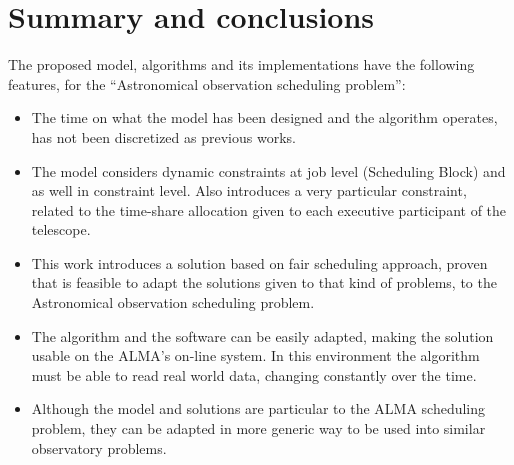 \section{Summary and conclusions}

The proposed model, algorithms and its implementations have the following features, for the ``Astronomical observation scheduling problem'':
\begin{itemize}
\item The time on what the model has been designed and the algorithm operates, has not been discretized as previous works.

\item The model considers dynamic constraints at job level (Scheduling Block) and as well in constraint level. Also introduces a very particular constraint, related to the time-share allocation given to each executive participant of the telescope.

\item This work introduces a solution based on fair scheduling approach, proven that is feasible to adapt the solutions given to that kind of problems, to the Astronomical observation scheduling problem.

\item The algorithm and the software can be easily adapted, making the solution usable on the ALMA's on-line system. In this environment the algorithm must be able to read real world data, changing constantly over the time. 

\item Although the model and solutions are particular to the ALMA scheduling problem, they can be adapted in more generic way to be used into similar observatory problems.

\end{itemize} 

